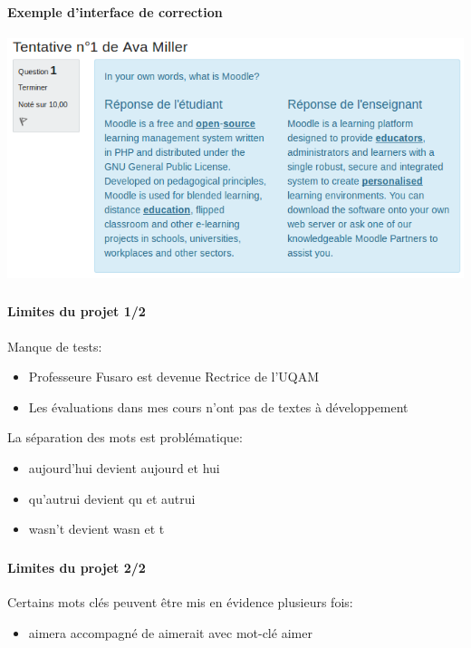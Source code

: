 \documentclass{beamer}
\begin{document}
  \begin{frame}
  \frametitle{\insertsection}
  \framesubtitle{Exemple d'interface de correction}
  \begin{center}
    \includegraphics[scale=0.4]{../images/questionform_correction.png}
  \end{center}
  \end{frame}
  
  \begin{frame}
  \frametitle{\insertsection}
  \framesubtitle{Limites du projet 1/2}
  Manque de tests:
  \begin{itemize}
    \item Professeure Fusaro est devenue Rectrice de l'UQAM
    \item Les \'evaluations dans mes cours n'ont pas de textes \`a d\'eveloppement
  \end{itemize}
  
  \bigskip
  
  La s\'eparation des mots est probl\'ematique:
  \begin{itemize}
    \item aujourd'hui devient \og aujourd \fg{} et \og hui \fg{} 
    \item qu'autrui devient \og qu \fg{} et \og autrui \fg{} 
    \item wasn't devient \og wasn \fg{} et \og t \fg{} 
  \end{itemize}
  \end{frame}
  
  \begin{frame}
  \frametitle{\insertsection}
  \framesubtitle{Limites du projet 2/2}
  Certains mots cl\'es peuvent \^etre mis en \'evidence plusieurs fois:
  \begin{itemize}
    \item aimera accompagn\'e de aimerait avec mot-cl\'e aimer
  \end{itemize}
  \end{frame}
  
\end{document}
